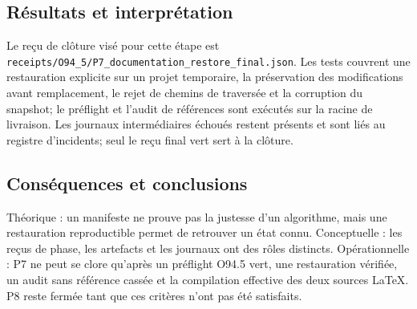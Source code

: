 \documentclass[11pt,a4paper]{article}
\begin{document}
\subsection{Résultats et interprétation}
Le reçu de clôture visé pour cette étape est \texttt{receipts/O94\_5/P7\_documentation\_restore\_final.json}. Les tests couvrent une restauration explicite sur un projet temporaire, la préservation des modifications avant remplacement, le rejet de chemins de traversée et la corruption du snapshot; le préflight et l'audit de références sont exécutés sur la racine de livraison. Les journaux intermédiaires échoués restent présents et sont liés au registre d'incidents; seul le reçu final vert sert à la clôture.

\subsection{Conséquences et conclusions}
Théorique : un manifeste ne prouve pas la justesse d'un algorithme, mais une restauration reproductible permet de retrouver un état connu. Conceptuelle : les reçus de phase, les artefacts et les journaux ont des rôles distincts. Opérationnelle : P7 ne peut se clore qu'après un préflight O94.5 vert, une restauration vérifiée, un audit sans référence cassée et la compilation effective des deux sources LaTeX. P8 reste fermée tant que ces critères n'ont pas été satisfaits.
\end{document}
